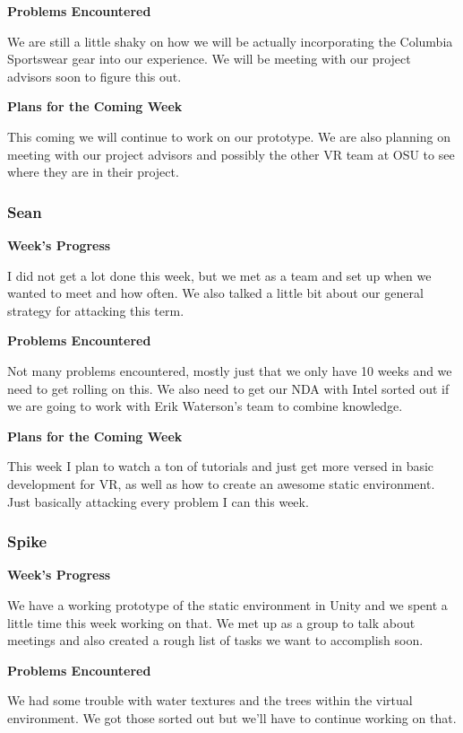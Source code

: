 \documentclass[10pt,journal,compsoc,onecolumn, draftclsnofoot]{IEEEtran}
\begin{document}
\noindent \textbf{Problems Encountered}

We are still a little shaky on how we will be actually incorporating the Columbia Sportswear gear into our experience. We will be meeting with our project advisors soon to figure this out.

\noindent \textbf{Plans for the Coming Week}

This coming we will continue to work on our prototype. We are also planning on meeting with our project advisors and possibly the other VR team at OSU to see where they are in their project.

\subsubsection{Sean}
\noindent \textbf{Week's Progress}

I did not get a lot done this week, but we met as a team and set up when we wanted to meet and how often.  We also talked a little bit about our general strategy for attacking this term.

\noindent \textbf{Problems Encountered}

Not many problems encountered, mostly just that we only have 10 weeks and we need to get rolling on this.  We also need to get our NDA with Intel sorted out if we are going to work with Erik Waterson's team to combine knowledge.

\noindent \textbf{Plans for the Coming Week}

This week I plan to watch a ton of tutorials and just get more versed in basic development for VR, as well as how to create an awesome static environment. Just basically attacking every problem I can this week.

\subsubsection{Spike}
\noindent \textbf{Week's Progress}

We have a working prototype of the static environment in Unity and we spent a little time this week working on that. We met up as a group to talk about meetings and also created a rough list of tasks we want to accomplish soon.

\noindent \textbf{Problems Encountered}

We had some trouble with water textures and the trees within the virtual environment. We got those sorted out but we'll have to continue working on that.
\end{document}
